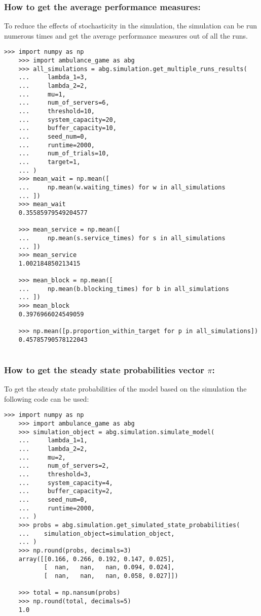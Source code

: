 \subsubsection{How to get the average performance measures:}
To reduce the effects of stochasticity in the simulation, the simulation can be 
run numerous times and get the average performance measures out of all the runs.

\begin{lstlisting}[style=pystyle]
    >>> import numpy as np
    >>> import ambulance_game as abg
    >>> all_simulations = abg.simulation.get_multiple_runs_results(
    ...     lambda_1=3,
    ...     lambda_2=2,
    ...     mu=1,
    ...     num_of_servers=6,
    ...     threshold=10,
    ...     system_capacity=20,
    ...     buffer_capacity=10,
    ...     seed_num=0,
    ...     runtime=2000,
    ...     num_of_trials=10,
    ...     target=1,
    ... )
    >>> mean_wait = np.mean([
    ...     np.mean(w.waiting_times) for w in all_simulations
    ... ])
    >>> mean_wait
    0.35585979549204577

    >>> mean_service = np.mean([
    ...     np.mean(s.service_times) for s in all_simulations
    ... ])
    >>> mean_service
    1.002184850213415

    >>> mean_block = np.mean([
    ...     np.mean(b.blocking_times) for b in all_simulations
    ... ])
    >>> mean_block
    0.3976966024549059

    >>> np.mean([p.proportion_within_target for p in all_simulations])
    0.45785790578122043
        
\end{lstlisting}

\subsubsection{How to get the steady state probabilities vector \( \pi \):}

To get the steady state probabilities of the model based on the simulation the
following code can be used:
\begin{lstlisting}[style=pystyle]
    >>> import numpy as np
    >>> import ambulance_game as abg
    >>> simulation_object = abg.simulation.simulate_model(
    ...     lambda_1=1,
    ...     lambda_2=2,
    ...     mu=2,
    ...     num_of_servers=2,
    ...     threshold=3,
    ...     system_capacity=4,
    ...     buffer_capacity=2,
    ...     seed_num=0,
    ...     runtime=2000,
    ... )
    >>> probs = abg.simulation.get_simulated_state_probabilities(
    ...    simulation_object=simulation_object,
    ... )
    >>> np.round(probs, decimals=3)
    array([[0.166, 0.266, 0.192, 0.147, 0.025],
           [  nan,   nan,   nan, 0.094, 0.024],
           [  nan,   nan,   nan, 0.058, 0.027]])

    >>> total = np.nansum(probs)
    >>> np.round(total, decimals=5)
    1.0
       
\end{lstlisting}

